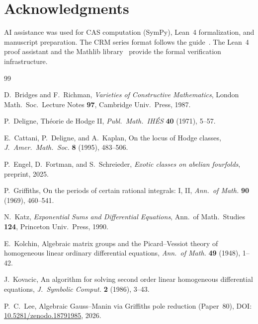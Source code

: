 \documentclass[11pt]{article}
\theoremstyle{plain}
\theoremstyle{definition}
\theoremstyle{remark}
\begin{document}
\section*{Acknowledgments}

AI assistance was used for CAS computation (SymPy), Lean~4 formalization,
and manuscript preparation. The CRM series format follows the
guide~\cite{FormatGuide}. The Lean~4 proof assistant and the Mathlib
library~\cite{Mathlib} provide the formal verification infrastructure.

\begin{thebibliography}{99}

D.~Bridges and F.~Richman,
\emph{Varieties of Constructive Mathematics},
London Math.\ Soc.\ Lecture Notes \textbf{97},
Cambridge Univ.\ Press, 1987.

P.~Deligne,
Th\'eorie de Hodge II,
\emph{Publ.\ Math.\ IH\'ES} \textbf{40} (1971), 5--57.

E.~Cattani, P.~Deligne, and A.~Kaplan,
On the locus of Hodge classes,
\emph{J.\ Amer.\ Math.\ Soc.} \textbf{8} (1995), 483--506.

P.~Engel, D.~Fortman, and S.~Schreieder,
\emph{Exotic classes on abelian fourfolds},
preprint, 2025.

P.~Griffiths,
On the periods of certain rational integrals: I, II,
\emph{Ann.\ of Math.} \textbf{90} (1969), 460--541.

N.~Katz,
\emph{Exponential Sums and Differential Equations},
Ann.\ of Math.\ Studies \textbf{124}, Princeton Univ.\ Press, 1990.

E.~Kolchin,
Algebraic matrix groups and the Picard--Vessiot theory of homogeneous
linear ordinary differential equations,
\emph{Ann.\ of Math.} \textbf{49} (1948), 1--42.

J.~Kovacic,
An algorithm for solving second order linear homogeneous differential
equations,
\emph{J.\ Symbolic Comput.} \textbf{2} (1986), 3--43.

P.~C.~Lee,
Algebraic Gauss--Manin via Griffiths pole reduction (Paper~80),
DOI: \href{https://doi.org/10.5281/zenodo.18791985}{10.5281/zenodo.18791985}, 2026.


\end{thebibliography}
\end{document}
